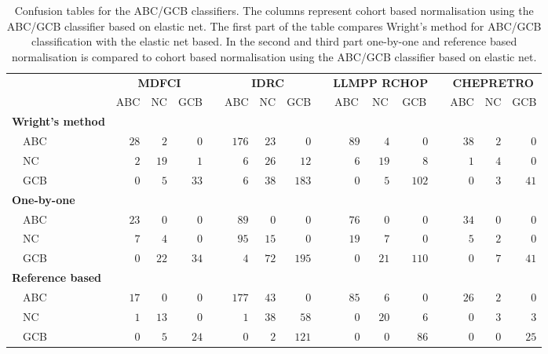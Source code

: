 \documentclass{article}
\begin{document}
\begin{table}[!tbp]
\footnotesize
\caption{Confusion tables for the ABC/GCB classifiers.
The columns represent cohort based normalisation using the ABC/GCB classifier based on elastic net.
The first part of the table compares Wright's method for ABC/GCB classification with the elastic net based.
In the second and third part one-by-one and reference based normalisation is compared to cohort based normalisation using the ABC/GCB classifier based on elastic net.\label{tab:confusionABCGCBHEMA}}
\begin{center}
\begin{tabular}{lrrrcrrrcrrrcrrr}
\hline\hline
\multicolumn{1}{l}{\bfseries  }&\multicolumn{3}{c}{\bfseries MDFCI}&\multicolumn{1}{c}{\bfseries }&\multicolumn{3}{c}{\bfseries IDRC}&\multicolumn{1}{c}{\bfseries }&\multicolumn{3}{c}{\bfseries LLMPP RCHOP}&\multicolumn{1}{c}{\bfseries }&\multicolumn{3}{c}{\bfseries CHEPRETRO}\tabularnewline
\cline{2-4} \cline{6-8} \cline{10-12} \cline{14-16}
\multicolumn{1}{l}{}&\multicolumn{1}{c}{ABC}&\multicolumn{1}{c}{NC}&\multicolumn{1}{c}{GCB}&\multicolumn{1}{c}{}&\multicolumn{1}{c}{ABC}&\multicolumn{1}{c}{NC}&\multicolumn{1}{c}{GCB}&\multicolumn{1}{c}{}&\multicolumn{1}{c}{ABC}&\multicolumn{1}{c}{NC}&\multicolumn{1}{c}{GCB}&\multicolumn{1}{c}{}&\multicolumn{1}{c}{ABC}&\multicolumn{1}{c}{NC}&\multicolumn{1}{c}{GCB}\tabularnewline
\hline
{\bfseries Wright's method}&&&&&&&&&&&&&&&\tabularnewline
~~ABC&$28$&$ 2$&$ 0$&&$176$&$23$&$  0$&&$89$&$ 4$&$  0$&&$38$&$2$&$ 0$\tabularnewline
~~NC&$ 2$&$19$&$ 1$&&$  6$&$26$&$ 12$&&$ 6$&$19$&$  8$&&$ 1$&$4$&$ 0$\tabularnewline
~~GCB&$ 0$&$ 5$&$33$&&$  6$&$38$&$183$&&$ 0$&$ 5$&$102$&&$ 0$&$3$&$41$\tabularnewline
\hline
{\bfseries One-by-one}&&&&&&&&&&&&&&&\tabularnewline
~~ABC&$23$&$ 0$&$ 0$&&$ 89$&$ 0$&$  0$&&$76$&$ 0$&$  0$&&$34$&$0$&$ 0$\tabularnewline
~~NC&$ 7$&$ 4$&$ 0$&&$ 95$&$15$&$  0$&&$19$&$ 7$&$  0$&&$ 5$&$2$&$ 0$\tabularnewline
~~GCB&$ 0$&$22$&$34$&&$  4$&$72$&$195$&&$ 0$&$21$&$110$&&$ 0$&$7$&$41$\tabularnewline
\hline
{\bfseries Reference based}&&&&&&&&&&&&&&&\tabularnewline
~~ABC&$17$&$ 0$&$ 0$&&$177$&$43$&$  0$&&$85$&$ 6$&$  0$&&$26$&$2$&$ 0$\tabularnewline
~~NC&$ 1$&$13$&$ 0$&&$  1$&$38$&$ 58$&&$ 0$&$20$&$  6$&&$ 0$&$3$&$ 3$\tabularnewline
~~GCB&$ 0$&$ 5$&$24$&&$  0$&$ 2$&$121$&&$ 0$&$ 0$&$ 86$&&$ 0$&$0$&$25$\tabularnewline
\hline
\end{tabular}
\end{center}
\end{table}
\end{document}
